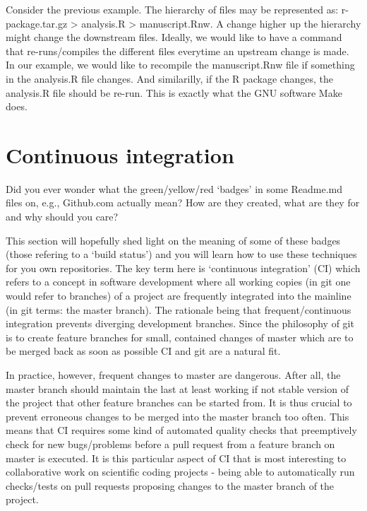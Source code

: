 \documentclass[]{book}
\begin{document}
Consider the previous example. The hierarchy of files may be represented
as: r-package.tar.gz \textgreater{} analysis.R \textgreater{}
manuscript.Rnw. A change higher up the hierarchy might change the
downstream files. Ideally, we would like to have a command that
re-runs/compiles the different files everytime an upstream change is
made. In our example, we would like to recompile the manuscript.Rnw file
if something in the analysis.R file changes. And similarilly, if the R
package changes, the analysis.R file should be re-run. This is exactly
what the GNU software Make does.

\section{Continuous integration}\label{continuous-integration-1}

Did you ever wonder what the green/yellow/red `badges' in some Readme.md
files on, e.g., Github.com actually mean? How are they created, what are
they for and why should you care?

This section will hopefully shed light on the meaning of some of these
badges (those refering to a `build status') and you will learn how to
use these techniques for you own repositories. The key term here is
`continuous integration' (CI) which refers to a concept in software
development where all working copies (in git one would refer to
branches) of a project are frequently integrated into the mainline (in
git terms: the master branch). The rationale being that
frequent/continuous integration prevents diverging development branches.
Since the philosophy of git is to create feature branches for small,
contained changes of master which are to be merged back as soon as
possible CI and git are a natural fit.

In practice, however, frequent changes to master are dangerous. After
all, the master branch should maintain the last at least working if not
stable version of the project that other feature branches can be started
from. It is thus crucial to prevent erroneous changes to be merged into
the master branch too often. This means that CI requires some kind of
automated quality checks that preemptively check for new bugs/problems
before a pull request from a feature branch on master is executed. It is
this particular aspect of CI that is most interesting to collaborative
work on scientific coding projects - being able to automatically run
checks/tests on pull requests proposing changes to the master branch of
the project.
\end{document}
